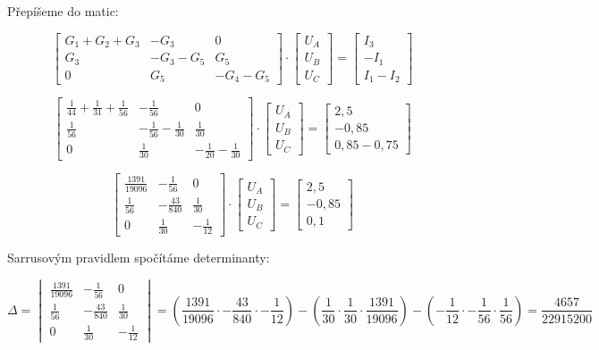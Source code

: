 Přepíšeme do matic:

\[ \begin{bmatrix}
G_{1} + G_{2} + G_{3} & -G_{3} & 0\\
G_{3} & -G_{3} - G_{5} & G_{5}\\
0 & G_{5} & -G_{4} - G_{5}
\end{bmatrix} \cdot 
\begin{bmatrix}
U_{A} \\ U_{B} \\ U_{C}
\end{bmatrix} =
\begin{bmatrix}
I_{3} \\ -I_{1} \\ I_{1} - I_{2}
\end{bmatrix}
\]

\[ \begin{bmatrix}
\frac{1}{44} + \frac{1}{31} + \frac{1}{56} & -\frac{1}{56} & 0\\
\frac{1}{56} & -\frac{1}{56} - \frac{1}{30} & \frac{1}{30}\\
0 & \frac{1}{30} & -\frac{1}{20} - \frac{1}{30}
\end{bmatrix} \cdot 
\begin{bmatrix}
U_{A} \\ U_{B} \\ U_{C}
\end{bmatrix} =
\begin{bmatrix}
2,5 \\ -0,85 \\ 0,85 - 0,75
\end{bmatrix}
\]

\[ \begin{bmatrix}
\frac{1391}{19096} & -\frac{1}{56} & 0\\
\frac{1}{56} & -\frac{43}{840} & \frac{1}{30}\\
0 & \frac{1}{30} & -\frac{1}{12}
\end{bmatrix} \cdot 
\begin{bmatrix}
U_{A} \\ U_{B} \\ U_{C}
\end{bmatrix} =
\begin{bmatrix}
2,5 \\ -0,85 \\ 0,1
\end{bmatrix}
\]

Sarrusovým pravidlem spočítáme determinanty:

\[ \Delta = \begin{vmatrix} 
\frac{1391}{19096} & -\frac{1}{56} & 0\\
\frac{1}{56} & -\frac{43}{840} & \frac{1}{30}\\
0 & \frac{1}{30} & -\frac{1}{12}
\end{vmatrix} =
\left(\frac{1391}{19096} \cdot -\frac{43}{840} \cdot -\frac{1}{12}\right) - \left(\frac{1}{30} \cdot \frac{1}{30} \cdot \frac{1391}{19096}\right) - \left(-\frac{1}{12} \cdot -\frac{1}{56} \cdot \frac{1}{56}\right) = \frac{4657}{22915200}
\]

